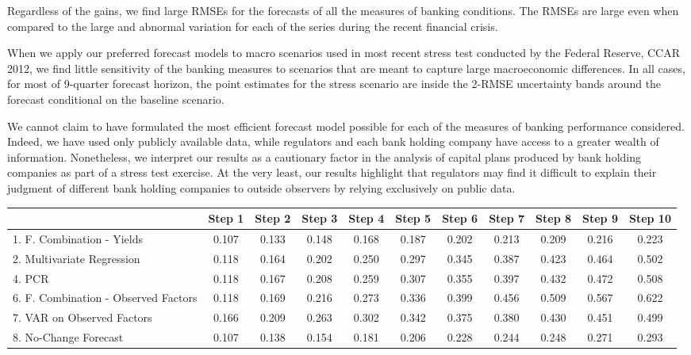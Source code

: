 \documentclass[12pt]{article}
\begin{document}
Regardless of the gains, we find large RMSEs for the forecasts of
all the measures of banking conditions. The RMSEs are large even
when compared to the large and abnormal variation for each of the
series during the recent financial crisis.

When we apply our preferred forecast models to macro scenarios
used in most recent stress test conducted by the Federal Reserve,
CCAR 2012, we find little sensitivity of the banking measures to
scenarios that are meant to capture large macroeconomic
differences. In all cases, for most of 9-quarter forecast horizon,
the point estimates for the stress scenario are inside the 2-RMSE
uncertainty bands around the forecast conditional on the baseline
scenario.

We cannot claim to have formulated the most efficient forecast
model possible for each of the measures of banking performance
considered. Indeed, we have used only publicly available data,
while regulators and each bank holding company have access to a
greater wealth of information. Nonetheless, we interpret our
results as a cautionary factor in the analysis of capital plans
produced by bank holding companies as part of a stress test
exercise. At the very least, our results highlight that regulators
may find it difficult to explain their judgment of different bank
holding companies to outside observers by relying exclusively on
public data.

\clearpage

\begin{table}
\center
\begin{tabular}{|l|c|c|c|c|c|c|c|c|c|c|}
\hline
&Step 1 &Step 2 &Step 3 &Step 4 &Step 5 &Step 6 &Step 7 &Step 8 &Step 9 &Step 10\\
\hline
1. F. Combination - Yields          &0.107&0.133&0.148&0.168&0.187&0.202&0.213&0.209&0.216&0.223\\
2. Multivariate Regression          &0.118&0.164&0.202&0.250&0.297&0.345&0.387&0.423&0.464&0.502\\
4. PCR                              &0.118&0.167&0.208&0.259&0.307&0.355&0.397&0.432&0.472&0.508\\
6. F. Combination - Observed Factors&0.118&0.169&0.216&0.273&0.336&0.399&0.456&0.509&0.567&0.622\\
7. VAR on Observed Factors          &0.166&0.209&0.263&0.302&0.342&0.375&0.380&0.430&0.451&0.499\\
8. No-Change Forecast               &0.107&0.138&0.154&0.181&0.206&0.228&0.244&0.248&0.271&0.293\\
\hline
\end{tabular}
\end{table}             



\clearpage
\end{document}
